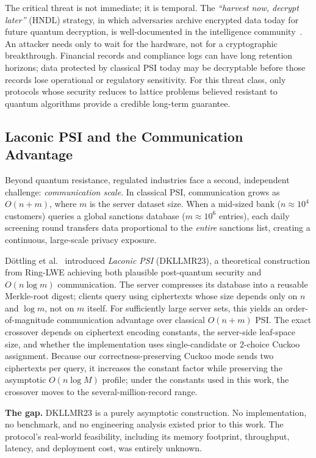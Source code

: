 \documentclass[preprint,12pt]{elsarticle}
\begin{document}
The critical threat is not immediate; it is temporal. The
\emph{``harvest now, decrypt later''} (HNDL) strategy, in which adversaries archive
encrypted data today for future quantum decryption, is well-documented in the
intelligence community~\cite{nsa_cnsa2022}. An attacker needs only to wait for
the hardware, not for a cryptographic breakthrough. Financial records and compliance logs can have long retention horizons;
data protected by classical PSI today may be decryptable before those
records lose operational or regulatory sensitivity. For this threat class, only protocols whose security reduces to
lattice problems believed resistant to quantum algorithms provide a credible
long-term guarantee.

\subsection{Laconic PSI and the Communication Advantage}

Beyond quantum resistance, regulated industries face a second, independent
challenge: \emph{communication scale}. In classical PSI, communication grows
as $O(n + m)$, where $m$ is the server dataset size. When a mid-sized bank
($n \approx 10^{4}$ customers) queries a global sanctions database
($m \approx 10^{6}$ entries), each daily screening round transfers data
proportional to the \emph{entire} sanctions list, creating a continuous, large-scale
privacy exposure.

D\"{o}ttling et al.~\cite{dottling2023laconic} introduced \emph{Laconic PSI}
(DKLLMR23), a theoretical construction from Ring-LWE achieving both plausible
post-quantum security and $O(n \log m)$ communication. The server compresses
its database into a reusable Merkle-root digest; clients query using
ciphertexts whose size depends only on $n$ and $\log m$, not on $m$ itself.
For sufficiently large server sets, this yields an order-of-magnitude
communication advantage over classical $O(n+m)$ PSI. The exact crossover
depends on ciphertext encoding constants, the server-side leaf-space size,
and whether the implementation uses single-candidate or 2-choice Cuckoo
assignment. Because our correctness-preserving Cuckoo mode sends two
ciphertexts per query, it increases the constant factor while preserving the
asymptotic $O(n\log M)$ profile; under the constants used in this work, the
crossover moves to the several-million-record range.

\textbf{The gap.} DKLLMR23 is a purely asymptotic construction. No
implementation, no benchmark, and no engineering analysis existed prior to
this work. The protocol's real-world feasibility, including its memory footprint,
throughput, latency, and deployment cost, was entirely unknown.
\end{document}
